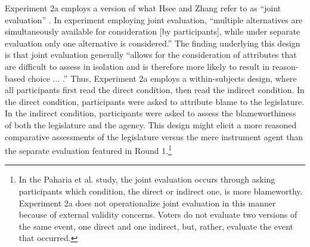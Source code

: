 \documentclass{article}
\begin{document}
Experiment 2a employs a version of what Hsee and Zhang refer to as ``joint evaluation'' \citep{Hsee2010}. In experiment employing joint evaluation, ``multiple alternatives are simultaneously available for consideration [by participants], while under separate evaluation only one alternative is considered.'' \citep[p. 2]{Paharia2009} The finding underlying this design is that joint evaluation generally ``allows for the consideration of attributes that are difficult to assess in isolation and is therefore more likely to result in reason-based choice ... .'' \citep[p. 2]{Paharia2009} Thus, Experiment 2a employs a within-subjects design, where all participants first read the direct condition, then read the indirect condition. In the direct condition, participants were asked to attribute blame to the legislature. In the indirect condition, participants were asked to assess the blameworthiness of both the legislature and the agency. This design might elicit a more reasoned comparative assessments of the legislature versus the mere instrument agent than the separate evaluation featured in Round 1.\footnote{In the Paharia et al. study, the joint evaluation occurs through asking participants which condition, the direct or indirect one, is more blameworthy. Experiment 2a does not operationalize joint evaluation in this manner because of external validity concerns. Voters do not evaluate two versions of the same event, one direct and one indirect, but, rather, evaluate the event that occurred.}
\end{document}
